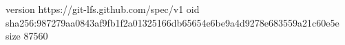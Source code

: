 version https://git-lfs.github.com/spec/v1
oid sha256:987279aa0843af9fb1f2a01325166db65654e6be9a4d9278e683559a21c60e5e
size 87560
